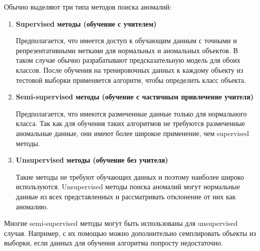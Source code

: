 \noindent Обычно выделяют три типа методов поиска аномалий:

\begin{enumerate}
	\item \textbf{Supervised методы (обучение с учителем)}

Предполагается, что имеется доступ к обучающим данным с точными и репрезентативными метками для нормальных и аномальных объектов. В таком случае обычно разрабатывают предсказательную модель для обоих классов. После обучения на тренировочных данных к каждому объекту из тестовой выборки применяется алгоритм, чтобы определить класс объекта. 
	
	\item \textbf{Semi-supervised методы (обучение с частичным привлечение учителя)}

Предполагается, что имеются размеченные данные только для нормального класса. Так как для обучения таких алгоритмов не требуются размеченные аномальные данные, они имеют более широкое применение, чем supervised методы.
	\item \textbf{Unsupervised методы (обучение без учителя)}

Такие методы не требуют обучающих данных и поэтому наиболее широко используются. Unsupervised методы поиска аномалий могут нормальные данные из всех представленных и рассматривать отклонение от них как аномалию.
\end{enumerate}
Многие semi-supervised методы могут быть использованы для unsupervised случая. Например, с их помощью можно дополнительно семплировать объекты из выборки, если данных для обучения алгоритма попросту недостаточно.